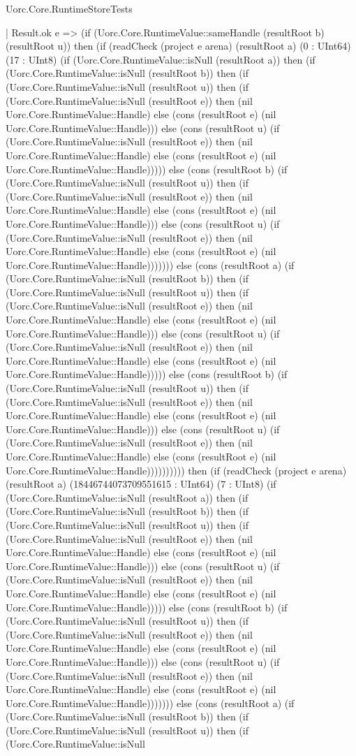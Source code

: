 \begin{lexlean}{Uorc.Core.RuntimeStoreTests}
\begin{semanticmodule}
{          | Result.ok e => (if (Uorc.Core.RuntimeValue::sameHandle (resultRoot b) (resultRoot u)) then (if (readCheck (project e arena) (resultRoot a) (0 : UInt64) (17 : UInt8) (if (Uorc.Core.RuntimeValue::isNull (resultRoot a)) then (if (Uorc.Core.RuntimeValue::isNull (resultRoot b)) then (if (Uorc.Core.RuntimeValue::isNull (resultRoot u)) then (if (Uorc.Core.RuntimeValue::isNull (resultRoot e)) then (nil Uorc.Core.RuntimeValue::Handle) else (cons (resultRoot e) (nil Uorc.Core.RuntimeValue::Handle))) else (cons (resultRoot u) (if (Uorc.Core.RuntimeValue::isNull (resultRoot e)) then (nil Uorc.Core.RuntimeValue::Handle) else (cons (resultRoot e) (nil Uorc.Core.RuntimeValue::Handle))))) else (cons (resultRoot b) (if (Uorc.Core.RuntimeValue::isNull (resultRoot u)) then (if (Uorc.Core.RuntimeValue::isNull (resultRoot e)) then (nil Uorc.Core.RuntimeValue::Handle) else (cons (resultRoot e) (nil Uorc.Core.RuntimeValue::Handle))) else (cons (resultRoot u) (if (Uorc.Core.RuntimeValue::isNull (resultRoot e)) then (nil Uorc.Core.RuntimeValue::Handle) else (cons (resultRoot e) (nil Uorc.Core.RuntimeValue::Handle))))))) else (cons (resultRoot a) (if (Uorc.Core.RuntimeValue::isNull (resultRoot b)) then (if (Uorc.Core.RuntimeValue::isNull (resultRoot u)) then (if (Uorc.Core.RuntimeValue::isNull (resultRoot e)) then (nil Uorc.Core.RuntimeValue::Handle) else (cons (resultRoot e) (nil Uorc.Core.RuntimeValue::Handle))) else (cons (resultRoot u) (if (Uorc.Core.RuntimeValue::isNull (resultRoot e)) then (nil Uorc.Core.RuntimeValue::Handle) else (cons (resultRoot e) (nil Uorc.Core.RuntimeValue::Handle))))) else (cons (resultRoot b) (if (Uorc.Core.RuntimeValue::isNull (resultRoot u)) then (if (Uorc.Core.RuntimeValue::isNull (resultRoot e)) then (nil Uorc.Core.RuntimeValue::Handle) else (cons (resultRoot e) (nil Uorc.Core.RuntimeValue::Handle))) else (cons (resultRoot u) (if (Uorc.Core.RuntimeValue::isNull (resultRoot e)) then (nil Uorc.Core.RuntimeValue::Handle) else (cons (resultRoot e) (nil Uorc.Core.RuntimeValue::Handle)))))))))) then (if (readCheck (project e arena) (resultRoot a) (18446744073709551615 : UInt64) (7 : UInt8) (if (Uorc.Core.RuntimeValue::isNull (resultRoot a)) then (if (Uorc.Core.RuntimeValue::isNull (resultRoot b)) then (if (Uorc.Core.RuntimeValue::isNull (resultRoot u)) then (if (Uorc.Core.RuntimeValue::isNull (resultRoot e)) then (nil Uorc.Core.RuntimeValue::Handle) else (cons (resultRoot e) (nil Uorc.Core.RuntimeValue::Handle))) else (cons (resultRoot u) (if (Uorc.Core.RuntimeValue::isNull (resultRoot e)) then (nil Uorc.Core.RuntimeValue::Handle) else (cons (resultRoot e) (nil Uorc.Core.RuntimeValue::Handle))))) else (cons (resultRoot b) (if (Uorc.Core.RuntimeValue::isNull (resultRoot u)) then (if (Uorc.Core.RuntimeValue::isNull (resultRoot e)) then (nil Uorc.Core.RuntimeValue::Handle) else (cons (resultRoot e) (nil Uorc.Core.RuntimeValue::Handle))) else (cons (resultRoot u) (if (Uorc.Core.RuntimeValue::isNull (resultRoot e)) then (nil Uorc.Core.RuntimeValue::Handle) else (cons (resultRoot e) (nil Uorc.Core.RuntimeValue::Handle))))))) else (cons (resultRoot a) (if (Uorc.Core.RuntimeValue::isNull (resultRoot b)) then (if (Uorc.Core.RuntimeValue::isNull (resultRoot u)) then (if (Uorc.Core.RuntimeValue::isNull }
\end{semanticmodule}
\end{lexlean}

